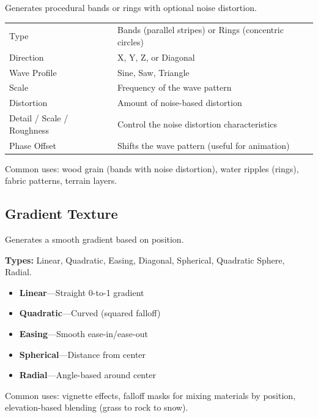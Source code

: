 Generates procedural bands or rings with optional noise distortion.

\begin{center}
\begin{tabularx}{\textwidth}{L{3.5cm}X}
\toprule
{}
 &  \\
\midrule
Type & Bands (parallel stripes) or Rings (concentric circles) \\
Direction & X, Y, Z, or Diagonal \\
Wave Profile & Sine, Saw, Triangle \\
Scale & Frequency of the wave pattern \\
Distortion & Amount of noise-based distortion \\
Detail / Scale / Roughness & Control the noise distortion characteristics \\
Phase Offset & Shifts the wave pattern (useful for animation) \\
\bottomrule
\end{tabularx}
\end{center}

Common uses: wood grain (bands with noise distortion), water
ripples (rings), fabric patterns, terrain layers.

\subsection{Gradient Texture}

Generates a smooth gradient based on position.

\textbf{Types:} Linear, Quadratic, Easing, Diagonal, Spherical,
Quadratic Sphere, Radial.

\begin{itemize}[leftmargin=2em]
  \item \textbf{Linear}---Straight 0-to-1 gradient
  \item \textbf{Quadratic}---Curved (squared falloff)
  \item \textbf{Easing}---Smooth ease-in/ease-out
  \item \textbf{Spherical}---Distance from center
  \item \textbf{Radial}---Angle-based around center
\end{itemize}

Common uses: vignette effects, falloff masks for mixing materials by
position, elevation-based blending (grass to rock to snow).

